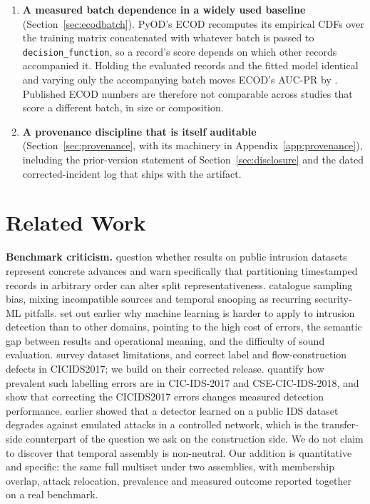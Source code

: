 \documentclass[manuscript,anonymous,review]{acmart}
\begin{document}
\begin{enumerate}
uninformative but inverted (AUC-ROC \RevBranchAuxOnlyAucroc), and because the
score is a maximum it sets the record's score wherever the tail is small,
dragging the deployed detector to near-chance AUC-ROC (\RevBranchCombinedAucroc) while its
tail component reaches \RevBranchTailOnlyAucroc. No metric computed on the
assembled score can attribute this, and the decomposition that finds it uses
values the scorer already computes.
\item \textbf{A measured batch dependence in a widely used baseline}
(Section~\ref{sec:ecodbatch}). PyOD's ECOD recomputes its empirical CDFs over
the training matrix concatenated with whatever batch is passed to
\texttt{decision\_function}, so a record's score depends on which other records
accompanied it. Holding the evaluated records and the fitted model identical
and varying only the accompanying batch moves ECOD's AUC-PR by
\RevEcodBatchDelta. Published ECOD numbers are therefore not comparable across
studies that score a different batch, in size or composition.
\item \textbf{A provenance discipline that is itself auditable}
(Section~\ref{sec:provenance}, with its machinery in
Appendix~\ref{app:provenance}), including the prior-version statement of
Section~\ref{sec:disclosure} and the dated corrected-incident log that ships
with the artifact.
\end{enumerate}

\section{Related Work}
\label{sec:related}

\textbf{Benchmark criticism.} \citet{catillo2023hype} question
whether results on public intrusion datasets represent concrete advances and
warn specifically that partitioning timestamped records in arbitrary order can
alter split representativeness. \citet{arp2022dosdonts} catalogue
sampling bias, mixing incompatible sources and temporal snooping as recurring
security-ML pitfalls. \citet{sommer2010outside} set out
earlier why machine learning is harder to apply to intrusion detection than to
other domains, pointing to the high cost of errors, the semantic gap between
results and operational meaning, and the difficulty of sound evaluation. \citet{ring2019datasets} survey dataset
limitations, and \citet{engelen2021cicids} correct label and
flow-construction defects in CICIDS2017; we build on their corrected release.
\citet{liu2022errorprevalence} quantify how prevalent such labelling
errors are in CIC-IDS-2017 and CSE-CIC-IDS-2018, and \citet{lanvin2022errors} show that correcting the CICIDS2017 errors changes
measured detection performance.
\citet{catillo2021critique} earlier showed that a detector
learned on a public IDS dataset degrades against emulated attacks in a
controlled network, which is the transfer-side counterpart of the question we
ask on the construction side. We do not claim to discover that temporal
assembly is non-neutral. Our addition is quantitative and specific: the same
full multiset under two assemblies, with membership overlap, attack relocation,
prevalence and measured outcome reported together on a real benchmark.
\end{document}
